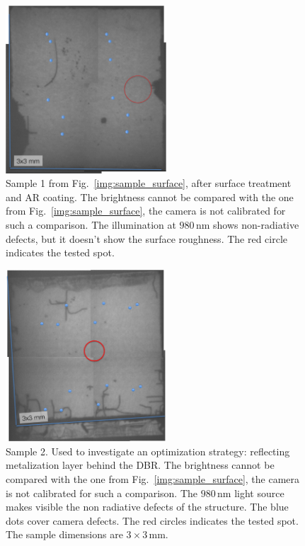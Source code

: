 \begin{figure}
\centering
\includegraphics[width=6cm]{img/sampleAR_surface.png}
\caption{Sample 1 from Fig.~\ref{img:sample_surface},
after surface treatment and AR coating.
The brightness cannot be compared
with the one from Fig.~\ref{img:sample_surface},
the camera is not calibrated for such a comparison.
The illumination at $980\,\mathrm{nm}$
shows non-radiative defects,
but it doesn't show the surface roughness.
The red circle indicates the tested spot.}
\label{img:sampleAR_surface}
\end{figure}

\begin{figure}
\centering
\includegraphics[width=6cm]{img/sampled6_surface.png}
\caption{Sample 2.
Used to investigate
an optimization strategy:
reflecting metalization layer behind the DBR.
The brightness cannot be compared
with the one from Fig.~\ref{img:sample_surface},
the camera is not calibrated for such a comparison.
The $980\,\mathrm{nm}$ light source
makes visible
the non radiative defects of the structure.
The blue dots cover camera defects.
The red circles indicates
the tested spot.
The sample dimensions are $3\times3\,\mathrm{mm}$.}
\label{img:sampled6_surface}
\end{figure}
